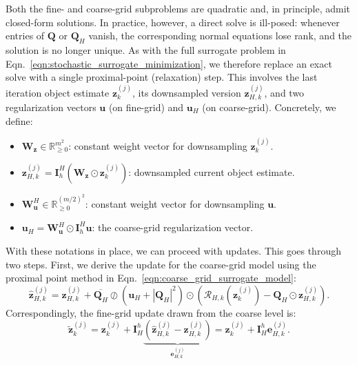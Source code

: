 \documentclass{article}
\numberwithin{equation}{section}
\begin{document}
Both the fine- and coarse-grid subproblems are quadratic and, in principle, admit closed-form solutions.  In practice, however, a direct solve is ill-posed: whenever entries of $\bm{Q}$ or $\bm{Q}_H$ vanish, the corresponding normal equations lose rank, and the solution is no longer unique.  As with the full surrogate problem in  Eqn.~\eqref{eqn:stochastic_surrogate_minimization}, we therefore replace an exact solve with a single proximal-point (relaxation) step. This involves the last iteration object estimate $\bm{z}_k^{(j)}$, its downsampled version $\bm{z}_{H,k}^{(j)}$, and two regularization vectors $\bm{u}$ (on fine-grid) and $\bm{u}_H$ (on coarse-grid). Concretely, we define:
\begin{itemize}
    \item $\bm{W}_{\bm{z}}\in \mathbb{R}^{m^2}_{\geq 0}$: {constant} weight vector for downsampling $\bm{z}_k^{(j)}$.
    \item {$\bm{z}_{H,k}^{(j)} = \bm{I}_h^H\left(\bm{W}_{\bm{z}}\odot\bm{z}_k^{(j)}\right)$: downsampled current object estimate.}
    \item $\bm{W}_{\bm{u}}^H\in \mathbb{R}^{(m/2)^2}_{\geq 0}$: {constant} weight vector for downsampling $\bm{u}$. 
    \item $\bm{u}_H = \bm{W}_{\bm{u}}^H \odot \bm{I}_h^H\bm{u}$: the coarse-grid regularization vector.
\end{itemize}

With these notations in place, we can proceed with updates. This goes through two steps. First, we derive the update for the coarse-grid model using the proximal point method in  Eqn.~\eqref{eqn:coarse_grid_surrogate_model}:
\begin{equation*} 
\hat{\bm{z}}_{H,k}^{(j)} = \bm{z}_{H,k}^{(j)} + \overline{\bm{Q}_H}\oslash\left(\bm{u}_H + |\bm{Q}_H|^2\right)\odot\left(\mathcal{R}_{H,k}\left(\bm{z}_k^{(j)}\right) - \bm{Q}_H\odot \bm{z}_{H,k}^{(j)}\right).
\end{equation*}
Correspondingly, the fine-grid update drawn from the coarse level is:
\begin{equation}\label{eqn:coarse-grid update}
    \widetilde{\bm{z}}_k^{(j)} = \bm{z}_k^{(j)} + \bm{I}_H^h\underbrace{\left(\hat{\bm{z}}_{H,k}^{(j)} - \bm{z}_{H,k}^{(j)}\right)}_{\bm{e}^{(j)}_{H,k}} = \bm{z}_k^{(j)} + \bm{I}_H^h \bm{e}^{(j)}_{H,k}.
\end{equation}
\end{document}
